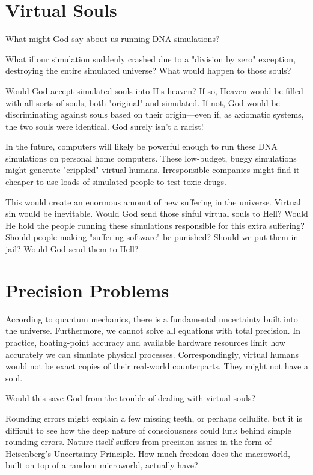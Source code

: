 \section{Virtual Souls}

What might God say about us running DNA simulations?

What if our simulation suddenly crashed due to a "division by zero" exception, destroying the entire simulated universe? What would happen to those souls?

Would God accept simulated souls into His heaven? If so, Heaven would be filled with all sorts of souls, both "original" and simulated.
If not, God would be discriminating against souls based on their origin—even if, as axiomatic systems, the two souls were identical.
God surely isn't a racist!

In the future, computers will likely be powerful enough to run these DNA simulations on personal home computers.
These low-budget, buggy simulations might generate "crippled" virtual humans.
Irresponsible companies might find it cheaper to use loads of simulated people to test toxic drugs.

This would create an enormous amount of new suffering in the universe.
Virtual sin would be inevitable.
Would God send those sinful virtual souls to Hell? Would He hold the people running
these simulations responsible for this extra suffering? Should people making "suffering software" be punished? Should we put them in jail? Would God send them to Hell?

  

\section{Precision Problems}
  
According to quantum mechanics, there is a fundamental uncertainty built into the universe.
Furthermore, we cannot solve all equations with total precision.
In practice, floating-point accuracy and available hardware resources limit how accurately we can simulate physical processes.
Correspondingly, virtual humans would not be exact copies of their real-world counterparts. They might not have a soul. 

Would this save God from the trouble of dealing with virtual souls?

Rounding errors might explain a few missing teeth, or perhaps cellulite, but it is difficult to see how the deep nature of consciousness could lurk behind simple rounding errors.
Nature itself suffers from precision issues in the form of Heisenberg’s Uncertainty Principle.
How much freedom does the macroworld, built on top of a random microworld, actually have?

